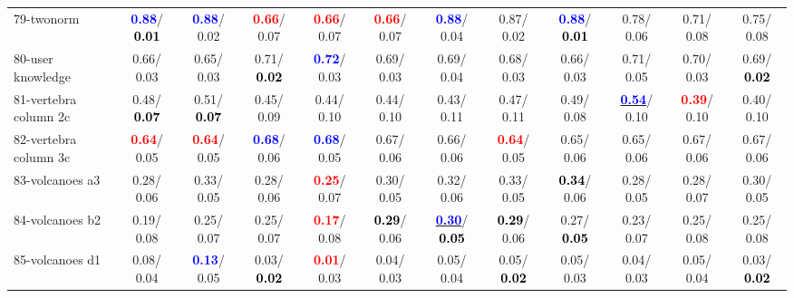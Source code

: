 \begin{table}[h]
\begin{center}
{\begin{tabular}{lc|c|c|c|c|c|c|c|c|c|c}
79-twonorm & \textcolor{blue}{\textbf{  0.88}}/\textcolor{black}{\textbf{  0.01}} & \textcolor{blue}{\textbf{  0.88}}/  0.02 & \textcolor{red}{\textbf{  0.66}}/  0.07 & \textcolor{red}{\textbf{  0.66}}/  0.07 & \textcolor{red}{\textbf{  0.66}}/  0.07 & \textcolor{blue}{\textbf{  0.88}}/  0.04 &   0.87/  0.02 & \textcolor{blue}{\textbf{  0.88}}/\textcolor{black}{\textbf{  0.01}} &   0.78/  0.06 &   0.71/  0.08 &   0.75/  0.08 \\
80-user knowledge &   0.66/  0.03 &   0.65/  0.03 &   0.71/\textcolor{black}{\textbf{  0.02}} & \textcolor{blue}{\textbf{  0.72}}/  0.03 &   0.69/  0.03 &   0.69/  0.04 &   0.68/  0.03 &   0.66/  0.03 &   0.71/  0.05 &   0.70/  0.03 &   0.69/\textcolor{black}{\textbf{  0.02}} \\
81-vertebra column 2c &   0.48/\textcolor{black}{\textbf{  0.07}} &   0.51/\textcolor{black}{\textbf{  0.07}} &   0.45/  0.09 &   0.44/  0.10 &   0.44/  0.10 &   0.43/  0.11 &   0.47/  0.11 &   0.49/  0.08 & \underline{\textcolor{blue}{\textbf{  0.54}}}/  0.10 & \textcolor{red}{\textbf{  0.39}}/  0.10 &   0.40/  0.10 \\
82-vertebra column 3c & \textcolor{red}{\textbf{  0.64}}/  0.05 & \textcolor{red}{\textbf{  0.64}}/  0.05 & \textcolor{blue}{\textbf{  0.68}}/  0.06 & \textcolor{blue}{\textbf{  0.68}}/  0.05 &   0.67/  0.06 &   0.66/  0.06 & \textcolor{red}{\textbf{  0.64}}/  0.05 &   0.65/  0.06 &   0.65/  0.06 &   0.67/  0.06 &   0.67/  0.06 \\
83-volcanoes a3 &   0.28/  0.06 &   0.33/  0.05 &   0.28/  0.06 & \textcolor{red}{\textbf{  0.25}}/  0.07 &   0.30/  0.05 &   0.32/  0.06 &   0.33/  0.05 & \textcolor{black}{\textbf{  0.34}}/  0.06 &   0.28/  0.05 &   0.28/  0.07 &   0.30/  0.05 \\
84-volcanoes b2 &   0.19/  0.08 &   0.25/  0.07 &   0.25/  0.07 & \textcolor{red}{\textbf{  0.17}}/  0.08 & \textcolor{black}{\textbf{  0.29}}/  0.06 & \underline{\textcolor{blue}{\textbf{  0.30}}}/\textcolor{black}{\textbf{  0.05}} & \textcolor{black}{\textbf{  0.29}}/  0.06 &   0.27/\textcolor{black}{\textbf{  0.05}} &   0.23/  0.07 &   0.25/  0.08 &   0.25/  0.08 \\
85-volcanoes d1 &   0.08/  0.04 & \textcolor{blue}{\textbf{  0.13}}/  0.05 &   0.03/\textcolor{black}{\textbf{  0.02}} & \textcolor{red}{\textbf{  0.01}}/  0.03 &   0.04/  0.03 &   0.05/  0.04 &   0.05/\textcolor{black}{\textbf{  0.02}} &   0.05/  0.03 &   0.04/  0.03 &   0.05/  0.04 &   0.03/\textcolor{black}{\textbf{  0.02}} \\ \hline

\end{tabular}}
\end{center}
\end{table}
